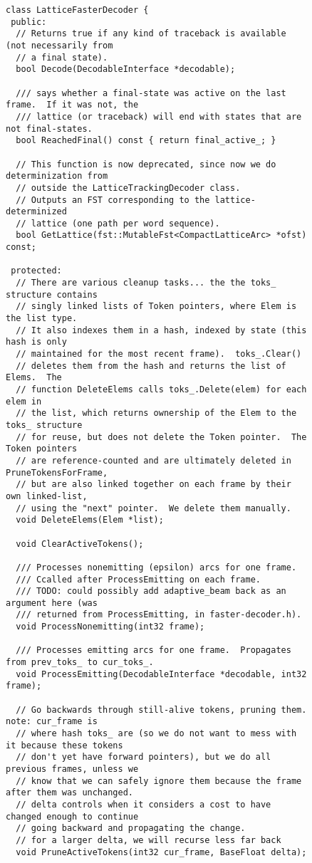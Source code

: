 \begin{figure}[!htp]
    \begin{center}
        \begin{verbatim}
class LatticeFasterDecoder {
 public:
  // Returns true if any kind of traceback is available (not necessarily from
  // a final state).
  bool Decode(DecodableInterface *decodable);

  /// says whether a final-state was active on the last frame.  If it was not, the
  /// lattice (or traceback) will end with states that are not final-states.
  bool ReachedFinal() const { return final_active_; }

  // This function is now deprecated, since now we do determinization from
  // outside the LatticeTrackingDecoder class.
  // Outputs an FST corresponding to the lattice-determinized
  // lattice (one path per word sequence).
  bool GetLattice(fst::MutableFst<CompactLatticeArc> *ofst) const;

 protected:
  // There are various cleanup tasks... the the toks_ structure contains
  // singly linked lists of Token pointers, where Elem is the list type.
  // It also indexes them in a hash, indexed by state (this hash is only
  // maintained for the most recent frame).  toks_.Clear()
  // deletes them from the hash and returns the list of Elems.  The
  // function DeleteElems calls toks_.Delete(elem) for each elem in
  // the list, which returns ownership of the Elem to the toks_ structure
  // for reuse, but does not delete the Token pointer.  The Token pointers
  // are reference-counted and are ultimately deleted in PruneTokensForFrame,
  // but are also linked together on each frame by their own linked-list,
  // using the "next" pointer.  We delete them manually.
  void DeleteElems(Elem *list);

  void ClearActiveTokens();

  /// Processes nonemitting (epsilon) arcs for one frame.
  /// Ccalled after ProcessEmitting on each frame.
  /// TODO: could possibly add adaptive_beam back as an argument here (was
  /// returned from ProcessEmitting, in faster-decoder.h).
  void ProcessNonemitting(int32 frame);
            
  /// Processes emitting arcs for one frame.  Propagates from prev_toks_ to cur_toks_.
  void ProcessEmitting(DecodableInterface *decodable, int32 frame);

  // Go backwards through still-alive tokens, pruning them.  note: cur_frame is
  // where hash toks_ are (so we do not want to mess with it because these tokens
  // don't yet have forward pointers), but we do all previous frames, unless we
  // know that we can safely ignore them because the frame after them was unchanged.
  // delta controls when it considers a cost to have changed enough to continue
  // going backward and propagating the change.
  // for a larger delta, we will recurse less far back
  void PruneActiveTokens(int32 cur_frame, BaseFloat delta);


\end{verbatim}
\end{center}
\end{figure}
